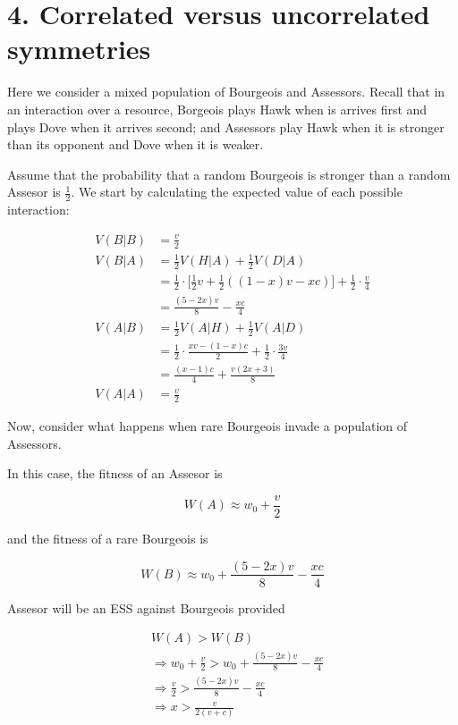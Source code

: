 \documentclass{article}
\begin{document}
\section*{4. Correlated versus uncorrelated symmetries}

Here we consider a mixed population of Bourgeois and Assessors. Recall
that in an interaction over a resource, Borgeois plays Hawk when is
arrives first and plays Dove when it arrives second; and Assessors play
Hawk when it is stronger than its opponent and Dove when it is weaker.

Assume that the probability that a random Bourgeois is stronger than a
random Assesor is $\frac{1}{2}$. We start by calculating the expected
value of each possible interaction:

\begin{align*}
    V(B|B) &= \frac{v}{2} \\
    V(B|A) &= \frac{1}{2} V(H|A) + \frac{1}{2} V(D|A) \\
           &= \frac{1}{2} \cdot \Big[\frac{1}{2} v + \frac{1}{2}((1 - x) v - x c)\Big]
              + \frac{1}{2} \cdot \frac{v}{4} \\
           &= \frac{(5 - 2 x) v}{8} - \frac{x c}{4} \\
    V(A|B) &= \frac{1}{2} V(A|H) + \frac{1}{2} V(A|D) \\
           &= \frac{1}{2} \cdot \frac{x v - (1 - x) c}{2}
              + \frac{1}{2} \cdot \frac{3 v}{4} \\
           &= \frac{(x - 1) c}{4} + \frac{v (2 x + 3)}{8} \\
    V(A|A) &= \frac{v}{2}
\end{align*}

Now, consider what happens when rare Bourgeois invade a population of
Assessors.

In this case, the fitness of an Assesor is

\begin{equation*}
    W(A) \approx w_0 + \frac{v}{2}
\end{equation*}

and the fitness of a rare Bourgeois is

\begin{equation*}
    W(B) \approx w_0 + \frac{(5 - 2 x) v}{8} - \frac{x c}{4}
\end{equation*}

Assesor will be an ESS against Bourgeois provided

\begin{align*}
    &W(A) > W(B) \\
    &\Rightarrow w_0 + \frac{v}{2} > w_0 + \frac{(5 - 2 x) v}{8} - \frac{x c}{4} \\
    &\Rightarrow \frac{v}{2} > \frac{(5 - 2 x) v}{8} - \frac{x c}{4} \\
    &\Rightarrow x > \frac{v}{2(v + c)}
\end{align*}
\end{document}
